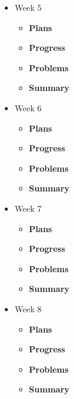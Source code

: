 \begin{itemize}
		\item{Week 5}
			\begin{itemize}
				\item \textbf{Plans} \\
				\item \textbf{Progress} \\
				\item \textbf{Problems} \\
				\item \textbf{Summary} \\
			\end{itemize}

		\item{Week 6}
			\begin{itemize}
				\item \textbf{Plans} \\
				\item \textbf{Progress} \\
				\item \textbf{Problems} \\
				\item \textbf{Summary} \\
			\end{itemize}

		\item{Week 7}
			\begin{itemize}
				\item \textbf{Plans} \\
				\item \textbf{Progress} \\
				\item \textbf{Problems} \\
				\item \textbf{Summary} \\
			\end{itemize}

		\item{Week 8}
			\begin{itemize}
				\item \textbf{Plans} \\
				\item \textbf{Progress} \\
				\item \textbf{Problems} \\
				\item \textbf{Summary} \\
			\end{itemize}


\end{itemize}
